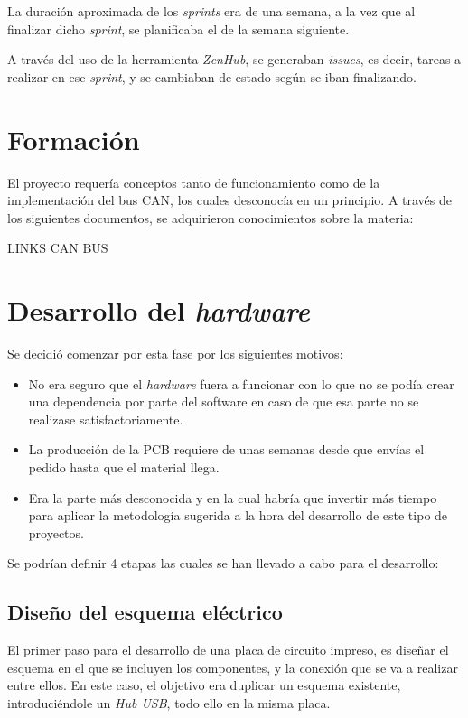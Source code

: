 La duración aproximada de los \emph{sprints} era de una semana, a la vez que al finalizar dicho \emph{sprint}, se planificaba el de la semana siguiente.

A través del uso de la herramienta \emph{ZenHub}, se generaban \emph{issues}, es decir, tareas a realizar en ese \emph{sprint}, y se cambiaban de estado según se iban finalizando.

\section{Formación}\label{formacion}

El proyecto requería conceptos tanto de funcionamiento como de la implementación del bus CAN, los cuales desconocía en un principio. A través de los siguientes documentos, se adquirieron conocimientos sobre la materia:


LINKS CAN BUS


\section{Desarrollo del \emph{hardware}}\label{desarrollo_del_hardware}

Se decidió comenzar por esta fase por los siguientes motivos:

\begin{itemize}
\item
No era seguro que el \emph{hardware} fuera a funcionar con lo que no se podía crear una dependencia por parte del software en caso de que esa parte no se realizase satisfactoriamente.

\item
La producción de la PCB requiere de unas semanas desde que envías el pedido hasta que el material llega.
\item
Era la parte más desconocida y en la cual habría que invertir más tiempo para aplicar la metodología sugerida a la hora del desarrollo de este tipo de proyectos.
\end{itemize}

Se podrían definir 4 etapas las cuales se han llevado a cabo para el desarrollo:

\subsection{Diseño del esquema eléctrico}\label{diseño_del_esquema_electrico}

El primer paso para el desarrollo de una placa de circuito impreso, es diseñar el esquema en el que se incluyen los componentes, y la conexión que se va a realizar entre ellos. En este caso, el objetivo era duplicar un esquema existente, introduciéndole un \emph{Hub USB}, todo ello en la misma placa.

